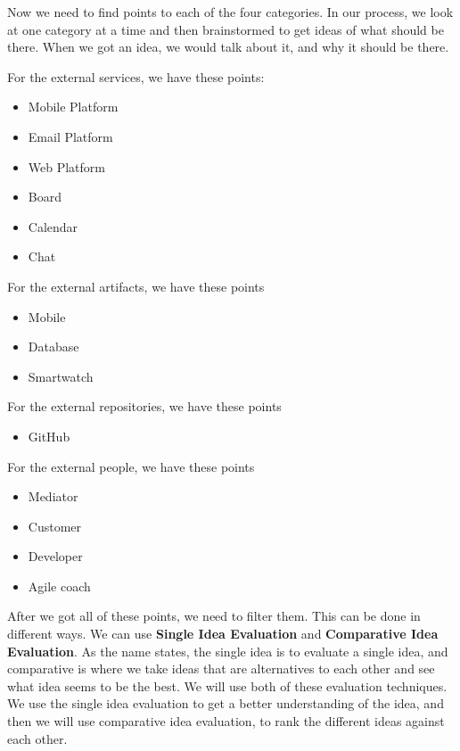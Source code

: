 Now we need to find points to each of the four categories.
In our process, we look at one category at a time and then brainstormed to get ideas of what should be there.
When we got an idea, we would talk about it, and why it should be there.

For the external services, we have these points:

\begin{itemize}
    \item Mobile Platform
    \item Email Platform
    \item Web Platform
    \item Board
    \item Calendar
    \item Chat 
\end{itemize}

For the external artifacts, we have these points

\begin{itemize}
    \item Mobile
    \item Database
    \item Smartwatch
\end{itemize}

For the external repositories, we have these points

\begin{itemize}
    \item GitHub
\end{itemize}

For the external people, we have these points

\begin{itemize}
    \item Mediator
    \item Customer
    \item Developer
    \item Agile coach
\end{itemize}

After we got all of these points, we need to filter them.
This can be done in different ways.
We can use \textbf{Single Idea Evaluation} and \textbf{Comparative Idea Evaluation}.
As the name states, the single idea is to evaluate a single idea, and comparative is where we take ideas that are alternatives to each other and see what idea seems to be the best.
We will use both of these evaluation techniques.
We use the single idea evaluation to get a better understanding of the idea, and then we will use comparative idea evaluation, to rank the different ideas against each other.

